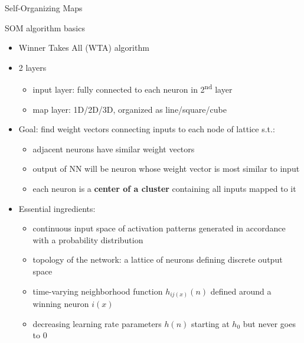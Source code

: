 \documentclass[9pt,t]{beamer}
\begin{document}
\begin{frame}{Self-Organizing Maps}
    \begin{alertblock}{SOM algorithm basics}
        \begin{itemize}
            \item Winner Takes All (WTA) algorithm
            \item 2 layers
            \begin{itemize}
                \item input layer: fully connected to each neuron in 2\textsuperscript{nd} layer
                \item map layer: 1D/2D/3D, organized as line/square/cube
            \end{itemize}
            \item Goal: find weight vectors connecting inputs to each node of lattice s.t.:
            \begin{itemize}
                \item adjacent neurons have similar weight vectors
                \item output of NN will be neuron whose weight vector is most similar to input
                \item each neuron is a \textbf{center of a cluster} containing all inputs mapped to it
            \end{itemize}
            \item Essential ingredients:
            \begin{itemize}
                \item continuous input space of activation patterns generated in accordance with a probability distribution
                \item topology of the network: a lattice of neurons defining discrete output space
                \item time-varying neighborhood function $ h_{ij(x)}(n) $ defined around a winning neuron $ i(x) $
                \item decreasing learning rate parameters $ h(n) $ starting at $ h_0 $ but never goes to $ 0 $
            \end{itemize}
        \end{itemize}
    \end{alertblock}
\end{frame}
\end{document}
